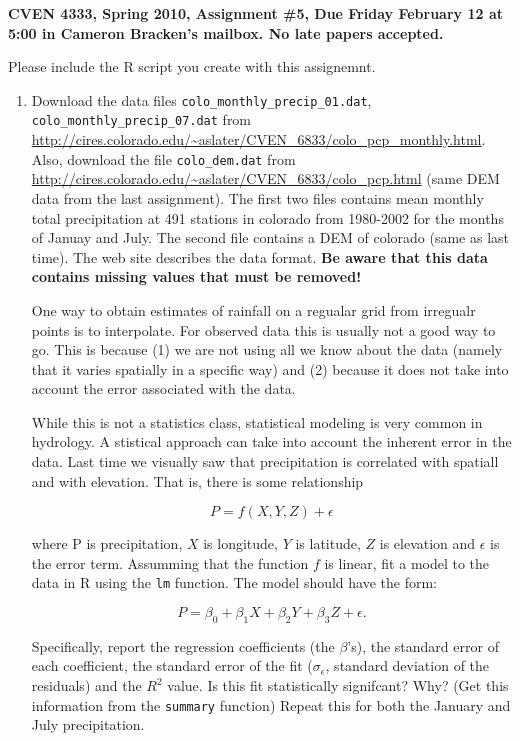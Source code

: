 \documentclass[11pt]{article}
\begin{document}
\textbf{CVEN 4333, Spring 2010, Assignment \#5, Due Friday February 12 at 5:00 in Cameron Bracken's mailbox. No late papers accepted.}

Please include the \textsf{R} script you create with this assignemnt.

\begin{enumerate}

\item Download the data files \texttt{colo\_monthly\_precip\_01.dat}, \texttt{colo\_monthly\_precip\_07.dat} from \url{http://cires.colorado.edu/~aslater/CVEN_6833/colo_pcp_monthly.html}. Also, download the file \texttt{colo\_dem.dat} from \url{http://cires.colorado.edu/~aslater/CVEN\_6833/colo_pcp.html} (same DEM data from the last assignment).  The first two files contains mean monthly total precipitation at 491 stations in colorado from 1980-2002 for the months of Januay and July.  The second file contains a DEM of colorado (same as last time). The web site describes the data format.  \textbf{Be aware that this data contains missing values that must be removed!}

One way to obtain estimates of rainfall on a regualar grid from irregualr points is to interpolate.   For observed data this is usually not a good way to go.  This is because (1) we are not using all we know about the data (namely that it varies spatially in a specific way) and (2) because it does not take into account the error associated with the data. 

While this is not a statistics class, statistical modeling is very common in hydrology.  A stistical approach can take into account the inherent error in the data.  Last time we visually saw that precipitation is correlated with spatiall and with elevation.  That is, there is some relationship

$$P = f(X,Y,Z) + \epsilon$$

where P is precipitation, $X$ is longitude, $Y$ is latitude, $Z$ is elevation and $\epsilon$ is the  error term.  Assumming that the function $f$ is linear, fit a model to the data in \textsf{R} using the \texttt{lm} function.  The model should have the form:

$$P = \beta_0 + \beta_1X+\beta_2Y+\beta_3Z + \epsilon.$$

Specifically, report the regression coefficients (the $\beta$'s), the standard error of each coefficient, the standard error of the fit ($\sigma_\epsilon$, standard deviation of the residuals) and the $R^2$ value. Is this fit statistically signifcant? Why? (Get this information from the \texttt{summary} function) Repeat this for both the January and July precipitation. 


\end{enumerate}
\end{document}
